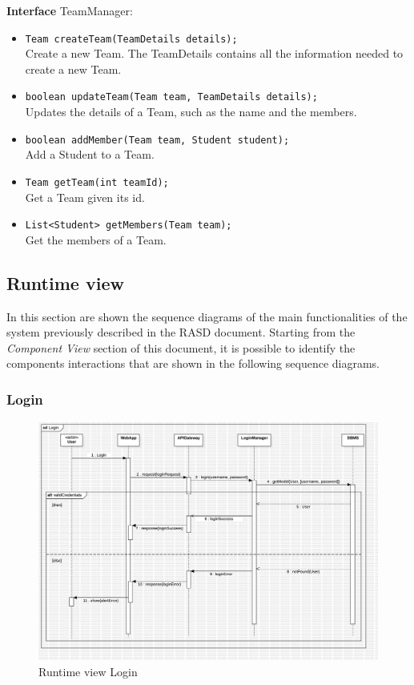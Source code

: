 \begin{itemize}
\textbf{Interface} TeamManager:
\begin{itemize}
    \item \texttt{Team createTeam(TeamDetails details);}
    \\ Create a new Team. The TeamDetails contains all the information needed to create a new Team.
    \item \texttt{boolean updateTeam(Team team, TeamDetails details);}
    \\ Updates the details of a Team, such as the name and the members.
    \item \texttt{boolean addMember(Team team, Student student);}
    \\ Add a Student to a Team.
    \item \texttt{Team getTeam(int teamId);}
    \\ Get a Team given its id.
    \item \texttt{List<Student> getMembers(Team team);}
    \\ Get the members of a Team.
\end{itemize}
\subsection{Runtime view}
In this section are shown the sequence diagrams of the main functionalities of the system previously described in the RASD document. Starting from the \textit{Component View} section of this document, it is possible to identify the components interactions that are shown in the following sequence diagrams.
\subsubsection*{Login}
\begin{figure}[H]
    \centering
    \includegraphics[width=\textwidth]{Diagrams/LoginSD.jpg}
    \caption{Runtime view Login}
    \label{fig:runtime_view_login}
\end{figure}

\end{itemize}
